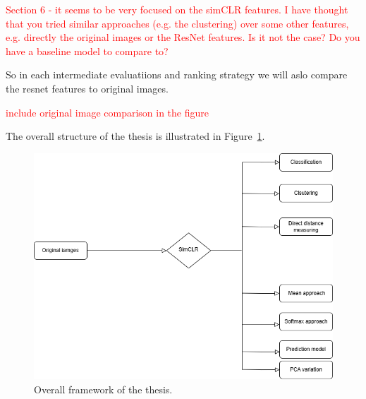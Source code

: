 \textcolor{red}{Section 6 - it seems to be very focused on the simCLR features. I have thought that you tried similar approaches (e.g. the clustering)
 over some other features, e.g. directly the original images or the ResNet features. Is it not the case? Do you have a baseline model to compare to?}

 So in each intermediate evaluatiions and ranking strategy we will aslo compare the resnet features to original images.

 \textcolor{red}{include original image comparison in the figure}

The overall structure of the thesis is illustrated in Figure~\ref{fig:BigOutline}.

\begin{figure}[H]
  \centering
  \includegraphics[scale=0.46]{figures/bigpic.png} 
  \caption{Overall framework of the thesis.}
  \label{fig:BigOutline}
\end{figure}

